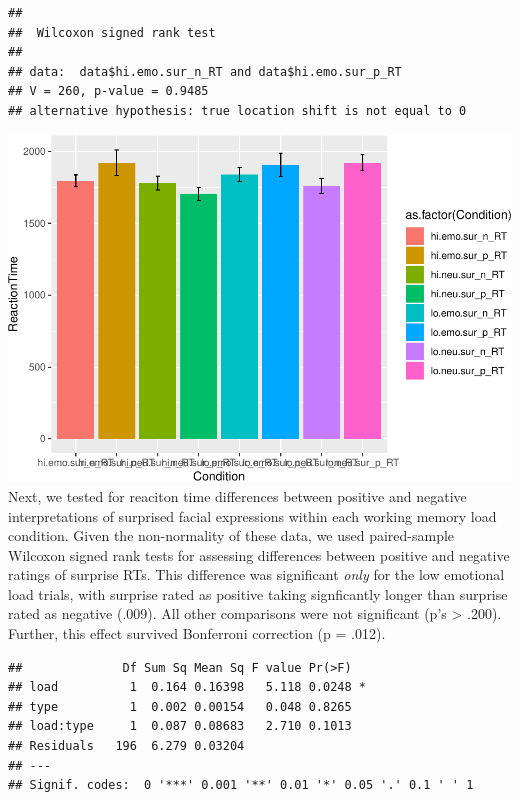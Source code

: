 \documentclass[man]{apa6}
\begin{document}
\begin{verbatim}
## 
##  Wilcoxon signed rank test
## 
## data:  data$hi.emo.sur_n_RT and data$hi.emo.sur_p_RT
## V = 260, p-value = 0.9485
## alternative hypothesis: true location shift is not equal to 0
\end{verbatim}

\includegraphics{Manuscript_files/figure-latex/RT by ratings-1.pdf}
Next, we tested for reaciton time differences between positive and negative interpretations of surprised facial expressions within each working memory load condition. Given the non-normality of these data, we used paired-sample Wilcoxon signed rank tests for assessing differences between positive and negative ratings of surprise RTs. This difference was significant \emph{only} for the low emotional load trials, with surprise rated as positive taking signficantly longer than surprise rated as negative (.009). All other comparisons were not significant (p's \textgreater{} .200). Further, this effect survived Bonferroni correction (p = .012).

\begin{verbatim}
##              Df Sum Sq Mean Sq F value Pr(>F)  
## load          1  0.164 0.16398   5.118 0.0248 *
## type          1  0.002 0.00154   0.048 0.8265  
## load:type     1  0.087 0.08683   2.710 0.1013  
## Residuals   196  6.279 0.03204                 
## ---
## Signif. codes:  0 '***' 0.001 '**' 0.01 '*' 0.05 '.' 0.1 ' ' 1
\end{verbatim}
\end{document}
